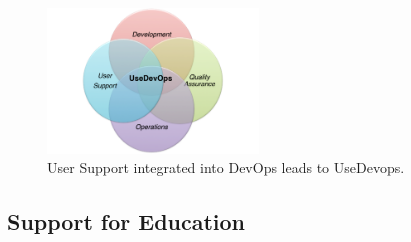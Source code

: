 \documentclass{article}
\begin{document}
\begin{figure}[htb]
  \centering
    \includegraphics[width=0.5\textwidth]{images/usedevops.pdf}
  \caption{User Support integrated into DevOps leads to UseDevops.}
  \label{F:usedevops}
\end{figure}
















\subsection{Support for Education}
\end{document}
